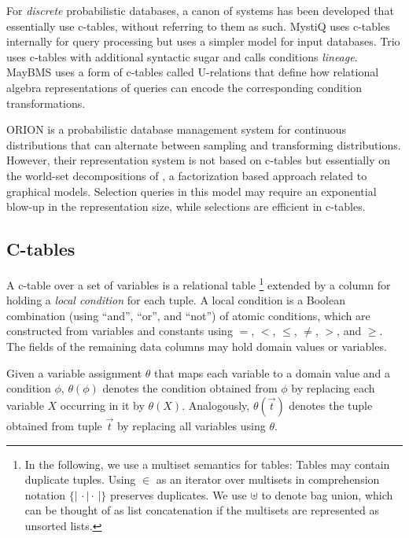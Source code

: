 For {\em discrete} probabilistic  databases, a canon of systems has been developed that essentially use c-tables, without referring to them as such. MystiQ  \cite{dalvi07efficient}  uses  c-tables internally  for  query processing  but  uses  a  simpler  model for  input  databases.   Trio \cite{WidomTrio2008}  uses  c-tables with  additional  syntactic sugar  and calls conditions {\em lineage}\/.  MayBMS \cite{AJKO2008}  uses a  form of  c-tables called  U-relations that define how relational algebra representations of queries can encode the corresponding condition transformations.

ORION \cite{ORION} is a probabilistic database management system for
continuous distributions that can alternate between sampling
and transforming distributions. However, their representation
system is not based on c-tables but essentially on the
world-set decompositions of \cite{AKO07WSD}, a factorization
based approach related to graphical models.
Selection queries in this model may require an exponential blow-up in the
representation size, while selections are efficient in c-tables.


\def\bagopen{\{\!|\,}
\def\bagclose{\,|\!\}}


\subsection{C-tables}
A c-table  over
a set  of variables is  a relational table \footnote{
In the following, we use a multiset semantics for tables: Tables may
contain duplicate tuples. Using $\in$ as an iterator over multisets in
comprehension notation $\bagopen \cdot \mid \cdot \bagclose$ preserves
duplicates. We use $\uplus$ to denote bag union, which can be thought of
as list concatenation if the multisets are represented as unsorted lists.
}
extended by a  column for holding a \textit{local  condition} for each
tuple.   A local condition  is a  Boolean combination  (using ``and'',
``or'', and ``not'') of  atomic conditions, which are constructed from
variables  and constants  using  $=$, $<$,  $\leq$,  $\neq$, $>$,  and
$\geq$.   The fields  of the  remaining data  columns may  hold domain
values or variables.

Given  a variable  assignment $\theta$  that maps  each variable  to a
domain  value  and  a  condition $\phi$,  $\theta(\phi)$  denotes  the
condition  obtained  from  $\phi$   by  replacing  each  variable  $X$
occurring  in  it   by  $\theta(X)$.   Analogously,  $\theta(\vec{t})$
denotes  the tuple  obtained  from tuple  $\vec{t}$  by replacing  all
variables using $\theta$.


